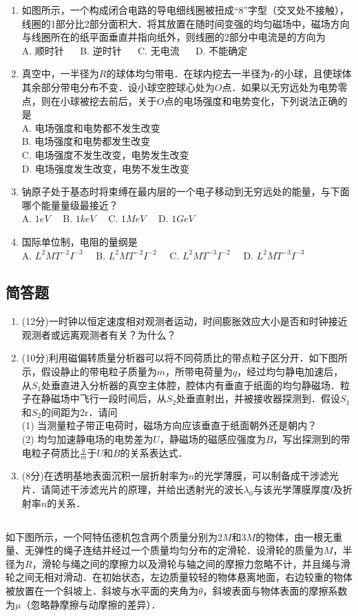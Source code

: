 \begin{enumerate}
\item 如图所示，一个构成闭合电路的导电细线圈被扭成“8”字型（交叉处不接触），线圈的1部分比2部分面积大．将其放置在随时间变强的均匀磁场中，磁场方向与线圈所在的纸平面垂直并指向纸外，则线圈的2部分中电流是的方向为\\
A. 顺时针 $\quad$
B. 逆时针 $\quad$
C. 无电流 $\quad$
D. 不能确定 $\quad$

\item 真空中，一半径为$R$的球体均匀带电．在球内挖去一半径为$r$的小球，且使球体其余部分带电分布不变．设小球空腔球心处为$O$点．如果以无穷远处为电势零点，则在小球被挖去前后，关于$O$点的电场强度和电势变化，下列说法正确的是\\
A. 电场强度和电势都不发生改变 \\
B. 电场强度和电势都发生改变 \\
C. 电场强度不发生改变，电势发生改变 \\
D. 电场强度发生改变，电势不发生改变 \\
\item 钠原子处于基态时将束缚在最内层的一个电子移动到无穷远处的能量，与下面哪个能量量级最接近？\\
A. $1eV\quad$
B. $1keV\quad$
C. $1MeV\quad$
D. $1GeV\quad$
\item 国际单位制，电阻的量纲是\\
A. $L^{2}MT^{-2}I^{-3}\quad$
B. $L^{2}MT^{-2}I^{-2}\quad$
C. $L^{2}MT^{-3}I^{-2}\quad$
D. $L^{2}MT^{-3}I^{-3}\quad$
\end{enumerate}
\subsection{简答题}
\begin{enumerate}
\item (12分)一时钟以恒定速度相对观测者运动，时间膨胀效应大小是否和时钟接近观测者或远离观测者有关？为什么？
\item (10分)利用磁偏转质量分析器可以将不同荷质比的带点粒子区分开．如下图所示，假设静止的带电粒子质量为$m$，所带电荷量为$q$，经过均匀静电加速后，从$S_{1}$处垂直进入分析器的真空主体腔，腔体内有垂直于纸面的均匀静磁场．粒子在静磁场中飞行一段时间后，从$S_{2}$处垂直射出，并被接收器探测到．假设$S_{1}$和$S_{2}$的间距为2r．请问\\
(1) 当测量粒子带正电荷时，磁场方向应该垂直于纸面朝外还是朝内？\\
(2) 均匀加速静电场的电势差为$U$，静磁场的磁感应强度为$B$，写出探测到的带电粒子荷质比$\frac{q}{m}$于$U$和$B$的关系表达式．
\item (8分)在透明基地表面沉积一层折射率为$n$的光学薄膜，可以制备成干涉滤光片．请简述干涉滤光片的原理，并给出透射光的波长$\lambda_{0}$与该光学薄膜厚度$l$及折射率$n$的关系．
\end{enumerate}
\subsection{ }
如下图所示，一个阿特伍德机包含两个质量分别为$2M$和$3M$的物体，由一根无重量、无弹性的绳子连结并经过一个质量均匀分布的定滑轮．设滑轮的质量为$M$，半径为$R$，滑轮与绳之间的摩擦力以及滑轮与轴之间的摩擦力忽略不计，并且绳与滑轮之间无相对滑动．在初始状态，左边质量较轻的物体悬离地面，右边较重的物体被放置在一个斜坡上．斜坡与水平面的夹角为$\theta$，斜坡表面与物体表面的摩擦系数为$\mu$（忽略静摩擦与动摩擦的差异）．\\